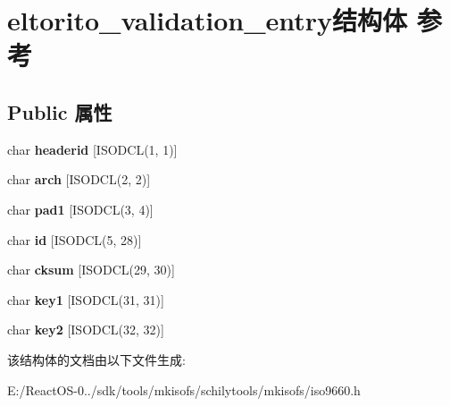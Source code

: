 \hypertarget{structeltorito__validation__entry}{}\section{eltorito\+\_\+validation\+\_\+entry结构体 参考}
\label{structeltorito__validation__entry}
\subsection*{Public 属性}
\begin{DoxyCompactItemize}
\item 
\mbox{\label{structeltorito__validation__entry_a9830c36e8f2fab3f38ab56249375ba54}} 
char {\bfseries headerid} \mbox{[}I\+S\+O\+D\+CL(1, 1)\mbox{]}
\item 
\mbox{\label{structeltorito__validation__entry_a79a13c1b1f785eb20364a0a02dbd6307}} 
char {\bfseries arch} \mbox{[}I\+S\+O\+D\+CL(2, 2)\mbox{]}
\item 
\mbox{\label{structeltorito__validation__entry_a7efd8a1e84098efbb7fc0f5f805fd88a}} 
char {\bfseries pad1} \mbox{[}I\+S\+O\+D\+CL(3, 4)\mbox{]}
\item 
\mbox{\label{structeltorito__validation__entry_a5e8b70c6f5ad5e21da81b2fe94ad61d5}} 
char {\bfseries id} \mbox{[}I\+S\+O\+D\+CL(5, 28)\mbox{]}
\item 
\mbox{\label{structeltorito__validation__entry_ad8ff6fde5caa23e39d26eac6af9ba185}} 
char {\bfseries cksum} \mbox{[}I\+S\+O\+D\+CL(29, 30)\mbox{]}
\item 
\mbox{\label{structeltorito__validation__entry_aca15b6627ed6fcff9beeec377ad2db91}} 
char {\bfseries key1} \mbox{[}I\+S\+O\+D\+CL(31, 31)\mbox{]}
\item 
\mbox{\label{structeltorito__validation__entry_a6a9b40c30fdfeb7d5f16b5c86753a11d}} 
char {\bfseries key2} \mbox{[}I\+S\+O\+D\+CL(32, 32)\mbox{]}
\end{DoxyCompactItemize}


该结构体的文档由以下文件生成\+:\begin{DoxyCompactItemize}
\item 
E\+:/\+React\+O\+S-\/0../sdk/tools/mkisofs/schilytools/mkisofs/iso9660.\+h\end{DoxyCompactItemize}
